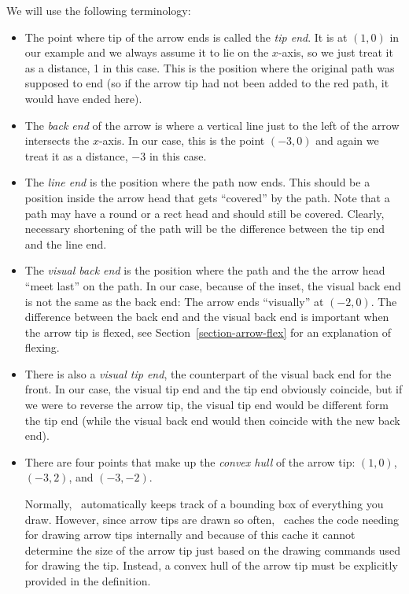 We will use the following terminology:
%
\begin{itemize}
    \item The point where tip of the arrow ends is called the \emph{tip end}.
        It is at $(1,0)$ in our example and we always assume it to lie on the
        $x$-axis, so we just treat it as a distance, 1 in this case. This is
        the position where the original path was supposed to end (so if the
        arrow tip had not been added to the red path, it would have ended
        here).
    \item The \emph{back end} of the arrow is where a vertical line just to the
        left of the arrow intersects the $x$-axis. In our case, this is the
        point $(-3,0)$ and again we treat it as a distance, $-3$ in this case.
    \item The \emph{line end} is the position where the path now ends. This
        should be a position inside the arrow head that gets ``covered'' by the
        path. Note that a path may have a round or a rect head and should still
        be covered. Clearly, necessary shortening of the path will be the
        difference between the tip end and the line end.
    \item The \emph{visual back end} is the position where the path and the the
        arrow head ``meet last'' on the path. In our case, because of the
        inset, the visual back end is not the same as the back end: The arrow
        ends ``visually'' at $(-2,0)$. The difference between the back end and
        the visual back end is important when the arrow tip is flexed, see
        Section~\ref{section-arrow-flex} for an explanation of flexing.
    \item There is also a \emph{visual tip end}, the counterpart of the visual
        back end for the front. In our case, the visual tip end and the tip end
        obviously coincide, but if we were to reverse the arrow tip, the visual
        tip end would be different form the tip end (while the visual back end
        would then coincide with the new back end).
    \item There are four points that make up the \emph{convex hull} of the
        arrow tip: $(1,0)$, $(-3,2)$, and $(-3,-2)$.

        Normally, \pgfname\ automatically keeps track of a bounding box of
        everything you draw. However, since arrow tips are drawn so often,
        \pgfname\ caches the code needing for drawing arrow tips internally and
        because of this cache it cannot determine the size of the arrow tip
        just based on the drawing commands used for drawing the tip. Instead, a
        convex hull of the arrow tip must be explicitly provided in the
        definition.
\end{itemize}

